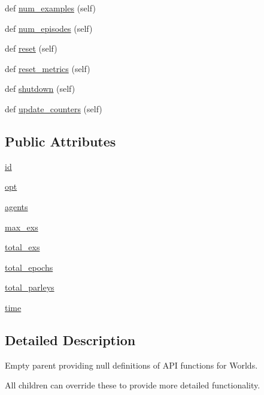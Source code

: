 \begin{DoxyCompactItemize}
\item 
def \hyperlink{classparlai_1_1core_1_1worlds_1_1World_a0402b615564d760fac542b8c5a504be5}{num\+\_\+examples} (self)
\item 
def \hyperlink{classparlai_1_1core_1_1worlds_1_1World_a7c7258c4ad6a6bdfc76287832876a25d}{num\+\_\+episodes} (self)
\item 
def \hyperlink{classparlai_1_1core_1_1worlds_1_1World_a363cc32add41645e1ba405808fafb5b4}{reset} (self)
\item 
def \hyperlink{classparlai_1_1core_1_1worlds_1_1World_af26e2aacab6282f8ef19f278d638adea}{reset\+\_\+metrics} (self)
\item 
def \hyperlink{classparlai_1_1core_1_1worlds_1_1World_a7e7e5a27569323dd334b87df6fef31e6}{shutdown} (self)
\item 
def \hyperlink{classparlai_1_1core_1_1worlds_1_1World_a77730e92a331274ab7b6ea3e7b99d1a4}{update\+\_\+counters} (self)
\end{DoxyCompactItemize}
\subsection*{Public Attributes}
\begin{DoxyCompactItemize}
\item 
\hyperlink{classparlai_1_1core_1_1worlds_1_1World_a568184e1c2ccaff10d9a0b69ecb8115a}{id}
\item 
\hyperlink{classparlai_1_1core_1_1worlds_1_1World_a3640d92718acd3e6942a28c1ab3678bd}{opt}
\item 
\hyperlink{classparlai_1_1core_1_1worlds_1_1World_a728f75194cc26ea4035047c46cf62608}{agents}
\item 
\hyperlink{classparlai_1_1core_1_1worlds_1_1World_a1fd36ad5eb83d8ac70bd20c0b3752b37}{max\+\_\+exs}
\item 
\hyperlink{classparlai_1_1core_1_1worlds_1_1World_acadde6b5d84d54b912aab56ec38d24dd}{total\+\_\+exs}
\item 
\hyperlink{classparlai_1_1core_1_1worlds_1_1World_a296f0478da2696d33dde49adb135fa17}{total\+\_\+epochs}
\item 
\hyperlink{classparlai_1_1core_1_1worlds_1_1World_ac23951eebe5c495ab2c79e57c960d681}{total\+\_\+parleys}
\item 
\hyperlink{classparlai_1_1core_1_1worlds_1_1World_a3246107ea5a86b97cef9164286b39925}{time}
\end{DoxyCompactItemize}


\subsection{Detailed Description}
\begin{DoxyVerb}Empty parent providing null definitions of API functions for Worlds.

All children can override these to provide more detailed functionality.
\end{DoxyVerb}
 

